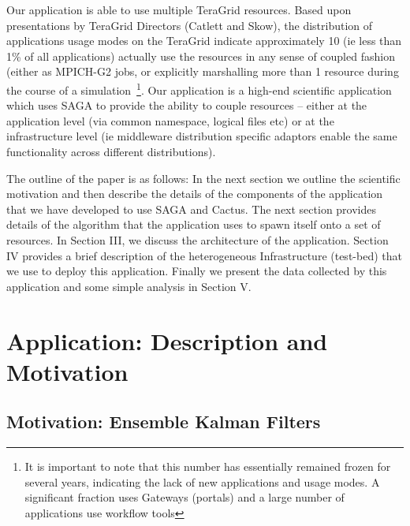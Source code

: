 \documentclass[conference,final]{IEEEtran}
\begin{document}
 Our application is able to use multiple TeraGrid
resources.  Based upon presentations by TeraGrid Directors (Catlett
and Skow), the distribution of applications usage modes on the
TeraGrid indicate approximately 10 (ie less than 1\% of all
applications) actually use the resources in any sense of coupled
fashion (either as MPICH-G2 jobs, or explicitly marshalling more than
1 resource during the course of a simulation~\footnote{It is important
  to note that this number has essentially remained frozen for several
  years, indicating the lack of new applications and usage modes. A
  significant fraction uses Gateways (portals) and a large number of
  applications use workflow tools}. Our application is a high-end
scientific application which uses SAGA to provide the ability to
couple resources -- either at the application level (via common
namespace, logical files etc) or at the infrastructure level (ie
middleware distribution specific adaptors enable the same
functionality across different distributions).

The outline of the paper is as follows: In the next section we outline
the scientific motivation and then describe the details of the
components of the application that we have developed to use SAGA and
Cactus.  The next section provides details of the algorithm that the
application uses to spawn itself onto a set of resources.  In Section
III, we discuss the architecture of the application. Section IV
provides a brief description of the heterogeneous Infrastructure
(test-bed) that we use to deploy this application. Finally we present
the data collected by this application and some simple analysis in
Section V.

\section{Application: Description and Motivation} 

\subsection{Motivation: Ensemble Kalman Filters}
\end{document}
